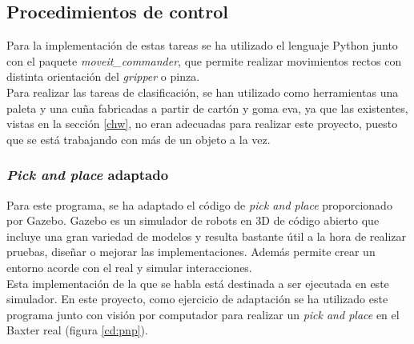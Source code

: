 \subsection{Procedimientos de control}
\noindent Para la implementación de estas tareas se ha utilizado el lenguaje Python junto con el paquete \textit{moveit\_commander}, que permite realizar movimientos rectos con distinta orientación del \textit{gripper} o pinza. \\
\noindent Para realizar las tareas de clasificación, se han utilizado como herramientas una paleta y una cuña fabricadas a partir de cartón y goma eva, ya que las existentes, vistas en la sección \ref{chw}, no eran adecuadas para realizar este proyecto, puesto que se está trabajando con más de un objeto a la vez. \\

\subsubsection{\textit{Pick and place} adaptado}
\noindent Para este programa, se ha adaptado el código de \textit{pick and place} proporcionado por Gazebo. Gazebo \cite{gazebo} es un simulador de robots en 3D de código abierto que incluye una gran variedad de modelos y resulta bastante útil a la hora de realizar pruebas, diseñar o mejorar las implementaciones. Además permite crear un entorno acorde con el real y simular interacciones.\\
Esta implementación de la que se habla está destinada a ser ejecutada en este simulador. En este proyecto, como ejercicio de adaptación se ha utilizado este programa junto con visión por computador para realizar un \textit{pick and place} en el Baxter real (figura \ref{cd:pnp}).\\

